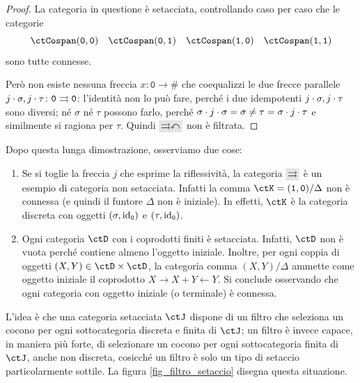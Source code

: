 \begin{proof}
 La categoria in questione è setacciata, controllando caso per caso che le categorie
 \[\ctCospan(\texttt{0},\texttt{0}) \quad
  \ctCospan(\texttt{0},\texttt{1}) \quad
  \ctCospan(\texttt{1},\texttt{0}) \quad
  \ctCospan(\texttt{1},\texttt{1}) \]
 sono tutte connesse.

 Però non esiste nessuna freccia \(x \colon \texttt{0} \to \#\) che coequalizzi le due frecce parallele \(j\cdot \sigma,j\cdot \tau \colon \texttt{0} \rightrightarrows \texttt{0}\): l'identità non lo può fare, perché i due idempotenti \(j\cdot \sigma,j\cdot \tau\) sono diversi; né \(\sigma\) né \(\tau\) possono farlo,	perché \(\sigma\cdot j\cdot \sigma = \sigma \neq \tau = \sigma\cdot j\cdot \tau\) e similmente si ragiona per \(\tau\). Quindi \(\genRG\) non è filtrata.
\end{proof}
Dopo questa lunga dimostrazione, osserviamo due cose:
\begin{enumerate}
 \item Se si toglie la freccia \(j\) che esprime la riflessività, la categoria \(\genAArrow\) è un esempio di categoria non setacciata. Infatti la comma \(\ctK=(\texttt{1},\texttt{0})/\Delta\) non è
       connessa (e quindi il funtore \(\Delta\) non è iniziale). In effetti, \(\ctK\) è la categoria discreta con oggetti
       \((\sigma,\mathrm{id}_{\texttt{0}})\) e \((\tau,\mathrm{id}_{\texttt{0}})\).
 \item Ogni categoria \(\ctD\) con i coprodotti finiti è setacciata. Infatti, \(\ctD\) non è vuota perché contiene almeno l'oggetto
       iniziale. Inoltre, per ogni coppia di oggetti \((X,Y) \in \ctD \times \ctD\), la categoria comma \((X,Y)/\Delta\) ammette come oggetto
       iniziale il coprodotto \(X \to X+Y \leftarrow Y\). Si conclude osservando che ogni categoria con oggetto iniziale (o terminale) è connessa.
\end{enumerate}
\begin{remark}
 L'idea è che una categoria setacciata \(\ctJ\) dispone di un filtro che seleziona un cocono per ogni sottocategoria discreta e finita di \(\ctJ\); un filtro è invece capace, in maniera più forte, di selezionare un cocono per ogni sottocategoria finita di \(\ctJ\), anche non discreta, cosicché un filtro è solo un tipo di setaccio particolarmente sottile. La figura \ref{fig_filtro_setaccio} disegna questa situazione.
\end{remark}
